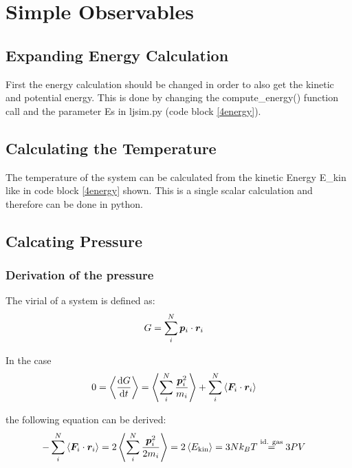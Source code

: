 \section{Simple Observables}

\subsection{Expanding Energy Calculation}

First the energy calculation should be changed in order to also get the kinetic and potential energy.
This is done by changing the compute\_energy() function call and the parameter Es in ljsim.py (code block \ref{4energy}).


\subsection{Calculating the Temperature}

The temperature of the system can be calculated from the kinetic Energy E\_kin like in code block \ref{4energy} shown. This is a single scalar calculation and therefore can be done in python.

\subsection{Calcating Pressure}

\subsubsection*{Derivation of the pressure}

The virial of a system is defined as:
\begin{align}
G
	&=\sum_i^N\boldsymbol{p}_i\cdot\boldsymbol{r}_i
	\label{4p1}
\end{align}

In the case
\begin{align}
0
	&=\left\langle\frac{\text{d} G}{\text{d} t}\right\rangle 
	=\left\langle\sum_i^N\frac{\boldsymbol{p}_i^2}{m_i}\right\rangle+\sum_i^N\left\langle\boldsymbol{F}_i\cdot\boldsymbol{r}_i\right\rangle
	\label{4p2}
\end{align}

the following equation can be derived:
\begin{align}
-\sum_i^N\left\langle\boldsymbol{F}_i\cdot\boldsymbol{r}_i\right\rangle
	&=2\left\langle\sum_i^N\frac{\boldsymbol{p}_i^2}{2m_i}\right\rangle
	=2\left\langle E_\text{kin}\right\rangle
	=3Nk_BT
	\stackrel{\text{id. gas}}{=}3PV
	\label{4p3}
\end{align}

